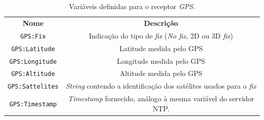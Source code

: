 \begin{table}[h]
	\centering
	\caption{\label{tab:gpsd} Variáveis definidas para o receptor
	\textit{GPS}.}
	\begin{tabular}{| c | c |}
		\hline
		\textbf{Nome} & \textbf{Descrição} \\	\hhline{|=|=|}
		\texttt{GPS:Fix} & Indicação do tipo de \textit{fix} (\textit{No fix},
		2D ou 3D \textit{fix})	\\ \hline  
		\texttt{GPS:Latitude} & Latitude medida pelo GPS \\ \hline
		\texttt{GPS:Longitude} & Longitude medida pelo GPS \\ \hline
		\texttt{GPS:Altitude} & Altitude medida pelo GPS \\ \hline
		\texttt{GPS:Sattelites} & \textit{String} contendo a identificação dos
		satélites usados para o \textit{fix} \\ \hline 
		\texttt{GPS:Timestamp} & \textit{Timestamp} fornecido, análogo à mesma
		variável do servidor NTP. \\ \hline
	\end{tabular}	   

\end{table}


